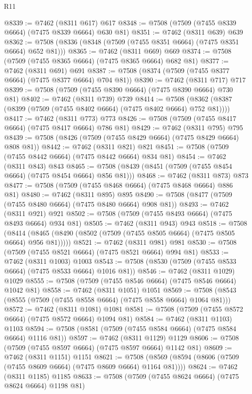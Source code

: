 \begin{lexlean}{R11}
\begin{coremodule}
{{{{{{{{{{{{{{{{{{{{{{{{{{{{{{{{{{{{{{{{{{{{{{{{{{{{{{{{{{{{{{{{{{{{{{{{{{{{{{{{{{@8339 := @7462 (@8311 @617) @617
@8348 := @7508 (@7509 (@7455 @8339 @6664) (@7475 @8339 @6664) @630 @81)
@8351 := @7462 (@8311 @639) @639
@8362 := @7508 (@8336 (@8348 (@7509 (@7455 @8351 @6664) (@7475 @8351 @6664) @652 @81)))
@8365 := @7462 (@8311 @669) @669
@8374 := @7508 (@7509 (@7455 @8365 @6664) (@7475 @8365 @6664) @682 @81)
@8377 := @7462 (@8311 @691) @691
@8387 := @7508 (@8374 (@7509 (@7455 @8377 @6664) (@7475 @8377 @6664) @704 @81))
@8390 := @7462 (@8311 @717) @717
@8399 := @7508 (@7509 (@7455 @8390 @6664) (@7475 @8390 @6664) @730 @81)
@8402 := @7462 (@8311 @739) @739
@8414 := @7508 (@8362 (@8387 (@8399 (@7509 (@7455 @8402 @6664) (@7475 @8402 @6664) @752 @81))))
@8417 := @7462 (@8311 @773) @773
@8426 := @7508 (@7509 (@7455 @8417 @6664) (@7475 @8417 @6664) @786 @81)
@8429 := @7462 (@8311 @795) @795
@8439 := @7508 (@8426 (@7509 (@7455 @8429 @6664) (@7475 @8429 @6664) @808 @81))
@8442 := @7462 (@8311 @821) @821
@8451 := @7508 (@7509 (@7455 @8442 @6664) (@7475 @8442 @6664) @834 @81)
@8454 := @7462 (@8311 @843) @843
@8465 := @7508 (@8439 (@8451 (@7509 (@7455 @8454 @6664) (@7475 @8454 @6664) @856 @81)))
@8468 := @7462 (@8311 @873) @873
@8477 := @7508 (@7509 (@7455 @8468 @6664) (@7475 @8468 @6664) @886 @81)
@8480 := @7462 (@8311 @895) @895
@8490 := @7508 (@8477 (@7509 (@7455 @8480 @6664) (@7475 @8480 @6664) @908 @81))
@8493 := @7462 (@8311 @921) @921
@8502 := @7508 (@7509 (@7455 @8493 @6664) (@7475 @8493 @6664) @934 @81)
@8505 := @7462 (@8311 @943) @943
@8518 := @7508
    (@8414 (@8465 (@8490 (@8502 (@7509 (@7455 @8505 @6664) (@7475 @8505 @6664) @956 @81)))))
@8521 := @7462 (@8311 @981) @981
@8530 := @7508 (@7509 (@7455 @8521 @6664) (@7475 @8521 @6664) @994 @81)
@8533 := @7462 (@8311 @1003) @1003
@8543 := @7508 (@8530 (@7509 (@7455 @8533 @6664) (@7475 @8533 @6664) @1016 @81))
@8546 := @7462 (@8311 @1029) @1029
@8555 := @7508 (@7509 (@7455 @8546 @6664) (@7475 @8546 @6664) @1042 @81)
@8558 := @7462 (@8311 @1051) @1051
@8569 := @7508 (@8543 (@8555 (@7509 (@7455 @8558 @6664) (@7475 @8558 @6664) @1064 @81)))
@8572 := @7462 (@8311 @1081) @1081
@8581 := @7508 (@7509 (@7455 @8572 @6664) (@7475 @8572 @6664) @1094 @81)
@8584 := @7462 (@8311 @1103) @1103
@8594 := @7508 (@8581 (@7509 (@7455 @8584 @6664) (@7475 @8584 @6664) @1116 @81))
@8597 := @7462 (@8311 @1129) @1129
@8606 := @7508 (@7509 (@7455 @8597 @6664) (@7475 @8597 @6664) @1142 @81)
@8609 := @7462 (@8311 @1151) @1151
@8621 := @7508 (@8569 (@8594 (@8606 (@7509 (@7455 @8609 @6664) (@7475 @8609 @6664) @1164 @81))))
@8624 := @7462 (@8311 @1185) @1185
@8633 := @7508 (@7509 (@7455 @8624 @6664) (@7475 @8624 @6664) @1198 @81)
}}}}}}}}}}}}}}}}}}}}}}}}}}}}}}}}}}}}}}}}}}}}}}}}}}}}}}}}}}}}}}}}}}}}}}}}}}}}}}}}}}
\end{coremodule}
\end{lexlean}
